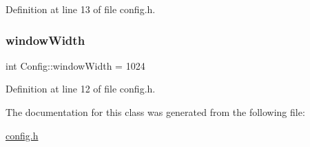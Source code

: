 Definition at line 13 of file config.\+h.

\hypertarget{class_config_a7b934416c53da81368fd7f800c2ae2c8}{}\label{class_config_a7b934416c53da81368fd7f800c2ae2c8} 
\subsubsection{\texorpdfstring{window\+Width}{windowWidth}}
{\footnotesize\ttfamily int Config\+::window\+Width = 1024}



Definition at line 12 of file config.\+h.



The documentation for this class was generated from the following file\+:\begin{DoxyCompactItemize}
\item 
\hyperlink{config_8h}{config.\+h}\end{DoxyCompactItemize}
